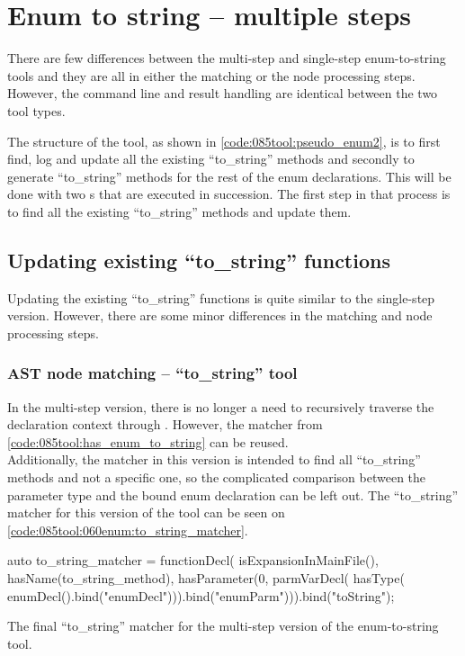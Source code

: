 \section{Enum to string -- multiple steps}

There are few differences between the multi-step and single-step enum-to-string tools and they are all in either the matching or the node processing steps. However, the command line and result handling are identical between the two tool types.

The structure of the tool, as shown in \cref{code:085tool:pseudo_enum2}, is to first find, log and update all the existing ``to\_string'' methods and secondly to generate ``to\_string'' methods for the rest of the enum declarations.
This will be done with two s that are executed in succession. The first step in that process is to find all the existing ``to\_string'' methods and update them. 

\subsection{Updating existing ``to\_string'' functions}
Updating the existing ``to\_string'' functions is quite similar to the single-step version. However, there are some minor differences in the matching and node processing steps.

\subsubsection*{AST node matching -- ``to\_string'' tool}
In the multi-step version, there is no longer a need to recursively traverse the declaration context through .
However, the  matcher from \cref{code:085tool:has_enum_to_string} can be reused.\\
Additionally, the matcher in this version is intended to find all ``to\_string'' methods and not a specific one, so the complicated comparison between the parameter type and the bound enum declaration can be left out.
The ``to\_string'' matcher for this version of the tool can be seen on \cref{code:085tool:060enum:to_string_matcher}.

\begin{listing}[H]
    \begin{cppcode}
auto to_string_matcher = functionDecl(
  isExpansionInMainFile(),
  hasName(to_string_method),
  hasParameter(0, 
    parmVarDecl(
	  hasType(
	    enumDecl().bind("enumDecl"))).bind("enumParm"))).bind("toString");
    \end{cppcode}
    \caption{The final ``to\_string'' matcher for the multi-step version of the enum-to-string tool.}
    \label{code:085tool:060enum:to_string_matcher}
\end{listing}

